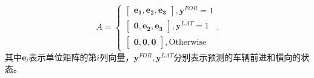 \begin{equation}
  A = 
  \begin{cases}
    \begin{bmatrix} \symbf{e_1}, \symbf{e_2}, \symbf{e_3}  \end{bmatrix}, \symbf{y}^{FOR} = 1 \\
    \begin{bmatrix} \symbf{0}, \symbf{e_2}, \symbf{e_3}  \end{bmatrix}, \symbf{y}^{LAT} = 1 \\
    \begin{bmatrix} \symbf{0}, \symbf{0}, \symbf{0}  \end{bmatrix}, \text{Otherwise}
  \end{cases}.
\end{equation}
其中$\symbf{e}_i$表示单位矩阵的第$i$列向量，$\symbf{y}^{FOR}, \symbf{y}^{LAT}$分别表示预测的车辆前进和横向的状态。

